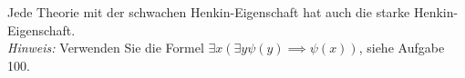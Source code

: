 
\begin{exercise}[140]

Jede Theorie mit der schwachen Henkin-Eigenschaft hat auch die starke Henkin-Eigenschaft. \\
\textit{Hinweis:} Verwenden Sie die Formel $\exists x (\exists y \psi(y) \implies \psi(x))$,
siehe Aufgabe 100.

\end{exercise}


\begin{solution}

\phantom{}

\end{solution}

